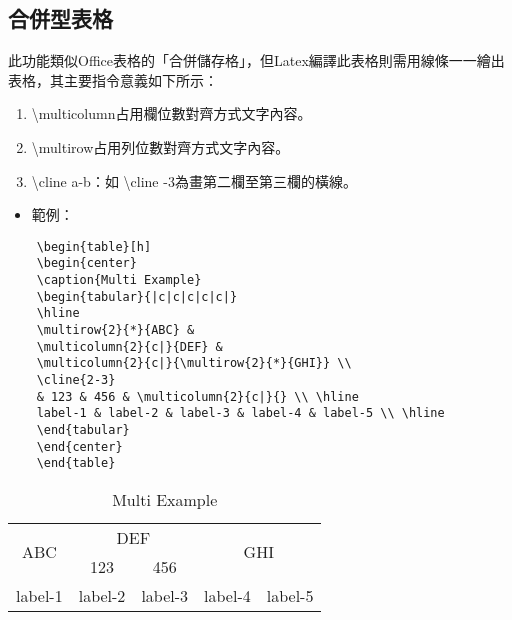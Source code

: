 \documentclass[12pt,a4paper]{report}
\begin{document}
\begin{CJK}{UTF8}{bkai}
\chapter{合併型表格}
此功能類似Office表格的「合併儲存格」，但Latex編譯此表格則需用線條一一繪出表格，其主要指令意義如下所示：
	\begin{enumerate}
	\item \textbackslash multicolumn\textbraceleft 占用欄位數\textbraceright \textbraceleft 對齊方式\textbraceright \textbraceleft 文字內容\textbraceright。
	\item \textbackslash multirow\textbraceleft 占用列位數\textbraceright \textbraceleft 對齊方式\textbraceright \textbraceleft 文字內容\textbraceright。
	\item \textbackslash cline \textbraceleft a-b\textbraceright：如 \textbackslash cline -3\textbraceright 為畫第二欄至第三欄的橫線。
	\end{enumerate}

\vspace{0.5cm}
\begin{itemize}
    \item 範例：
\end{itemize}

\vspace{-0.5cm}

\begin{lstlisting}
	\begin{table}[h]
	\begin{center}
	\caption{Multi Example}
	\begin{tabular}{|c|c|c|c|c|}
	\hline
	\multirow{2}{*}{ABC} &
	\multicolumn{2}{c|}{DEF} &
	\multicolumn{2}{c|}{\multirow{2}{*}{GHI}} \\
	\cline{2-3}
	& 123 & 456 & \multicolumn{2}{c|}{} \\ \hline
	label-1 & label-2 & label-3 & label-4 & label-5 \\ \hline
	\end{tabular}
	\end{center}
	\end{table}
\end{lstlisting}



\begin{table} [h]
\begin{center}
\caption{Multi Example}
\begin{tabular}{|c|c|c|c|c|}
\hline
\multirow{2}{*}{ABC} &
\multicolumn{2}{c|}{DEF} &
\multicolumn{2}{c|}{\multirow{2}{*}{GHI}} \\
\cline{2-3}
  & 123 & 456 & \multicolumn{2}{c|}{} \\
\hline
label-1 & label-2 & label-3 & label-4 & label-5 \\
\hline
\end{tabular}
\end{center}
\end{table}







\end{CJK}
\end{document}
